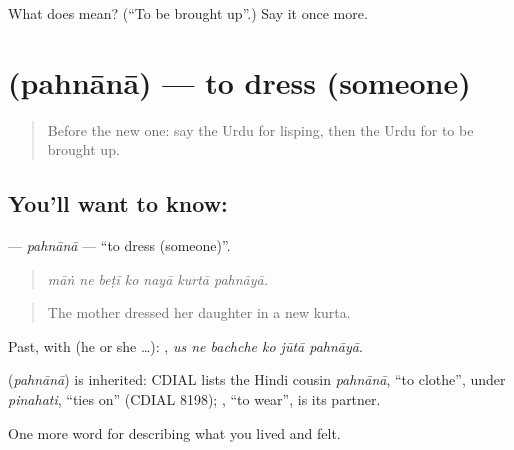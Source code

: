 \begin{tcolorbox}[breakable,colback=teal!4,colframe=teal!35!black,title={Before you move on}]
What does  mean? (\textquotedblleft{}To be brought up\textquotedblright{}.) Say it once more.
\end{tcolorbox}
\section[\texorpdfstring{\ur{پہنانا} (pahnānā)}{پہنانا (pahnānā)}]{ (pahnānā) — to dress (someone)}

\label{lesson:UR-C485-pahnana}



\begin{quote}
Before the new one: say the Urdu for lisping, then the Urdu for to be brought up.
\end{quote}

\subsection*{You'll want to know: }
\textbf{} — \emph{pahnānā} — \textquotedblleft{}to dress (someone)\textquotedblright{}.

\begin{quote}
      
\end{quote}

\begin{quote}
\emph{māṅ ne beṭī ko nayā kurtā pahnāyā.}
\end{quote}

\begin{quote}
The mother dressed her daughter in a new kurta.
\end{quote}

Past, with  (he or she …):      , \emph{us ne bachche ko jūtā pahnāyā}.

\begin{cousinweb}
\textbf{} (\emph{pahnānā}) is inherited: CDIAL lists the Hindi cousin \emph{pahnānā}, \textquotedblleft{}to clothe\textquotedblright{}, under \emph{pinahati}, \textquotedblleft{}ties on\textquotedblright{} (CDIAL 8198); \textbf{}, \textquotedblleft{}to wear\textquotedblright{}, is its partner.
\end{cousinweb}

\begin{grammarlens}[title={What you've built}]
One more word for describing what you lived and felt.
\end{grammarlens}

